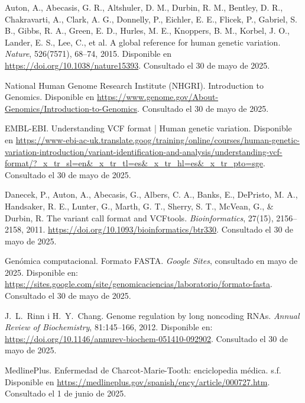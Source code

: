 \documentclass[11pt,spanish,listoffigures,listoftables]{tfgetsinf}
\begin{document}
\begin{thebibliography}{99}
   Auton, A., Abecasis, G. R., Altshuler, D. M., Durbin, R. M., Bentley, D. R., Chakravarti, A., Clark, A. G., Donnelly, P., Eichler, E. E., Flicek, P., Gabriel, S. B., Gibbs, R. A., Green, E. D., Hurles, M. E., Knoppers, B. M., Korbel, J. O., Lander, E. S., Lee, C., et al.  
   \newblock A global reference for human genetic variation.  
   \newblock \textit{Nature}, 526(7571), 68–74, 2015.  
   \newblock Disponible en 
   \newblock \url{https://doi.org/10.1038/nature15393}.
   \newblock Consultado el 30 de mayo de 2025.
   
   National Human Genome Research Institute (NHGRI).  
   \newblock Introduction to Genomics.  
   \newblock Disponible en  
   \newblock \url{https://www.genome.gov/About-Genomics/Introduction-to-Genomics}.
   \newblock Consultado el 30 de mayo de 2025.


   EMBL-EBI.  
   \newblock Understanding VCF format | Human genetic variation.  
   \newblock Disponible en 
   \newblock \url{https://www-ebi-ac-uk.translate.goog/training/online/courses/human-genetic-variation-introduction/variant-identification-and-analysis/understanding-vcf-format/?_x_tr_sl=en&_x_tr_tl=es&_x_tr_hl=es&_x_tr_pto=sge}.
   \newblock Consultado el 30 de mayo de 2025.
   
   Danecek, P., Auton, A., Abecasis, G., Albers, C. A., Banks, E., DePristo, M. A., Handsaker, R. E., Lunter, G., Marth, G. T., Sherry, S. T., McVean, G., \& Durbin, R.  
   \newblock The variant call format and VCFtools.  
   \newblock \textit{Bioinformatics}, 27(15), 2156–2158, 2011.  
   \newblock \url{https://doi.org/10.1093/bioinformatics/btr330}.
   \newblock Consultado el 30 de mayo de 2025.

   Genómica computacional.  
   \newblock Formato FASTA.  
   \newblock \textit{Google Sites}, consultado en mayo de 2025.  
   \newblock Disponible en: 
   \newblock \url{https://sites.google.com/site/genomicaciencias/laboratorio/formato-fasta}.
   \newblock Consultado el 30 de mayo de 2025.

   J.~L.~Rinn i H.~Y.~Chang.
   \newblock Genome regulation by long noncoding RNAs.
   \newblock \textit{Annual Review of Biochemistry}, 81:145--166, 2012.
   \newblock Disponible en:
   \newblock \url{https://doi.org/10.1146/annurev-biochem-051410-092902}.
   \newblock Consultado el 30 de mayo de 2025.

   MedlinePlus.  
   \newblock Enfermedad de Charcot-Marie-Tooth: enciclopedia médica.  
   \newblock s.f.  
   \newblock Disponible en  
   \url{https://medlineplus.gov/spanish/ency/article/000727.htm}.  
   \newblock Consultado el 1 de junio de 2025.


\end{thebibliography}
\end{document}
